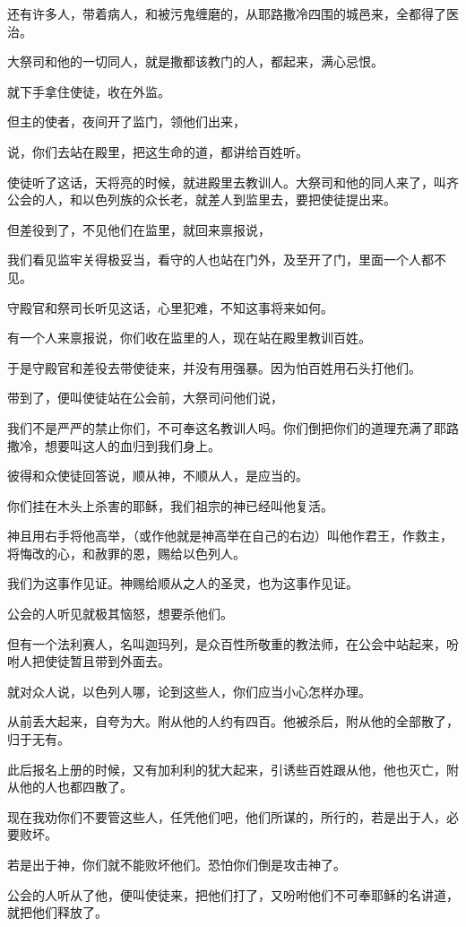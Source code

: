 \documentclass[12pt,oneside]{book}
\begin{document}
还有许多人，带着病人，和被污鬼缠磨的，从耶路撒冷四围的城邑来，全都得了医治。

大祭司和他的一切同人，就是撒都该教门的人，都起来，满心忌恨。

就下手拿住使徒，收在外监。

但主的使者，夜间开了监门，领他们出来，

说，你们去站在殿里，把这生命的道，都讲给百姓听。

使徒听了这话，天将亮的时候，就进殿里去教训人。大祭司和他的同人来了，叫齐公会的人，和以色列族的众长老，就差人到监里去，要把使徒提出来。

但差役到了，不见他们在监里，就回来禀报说，

我们看见监牢关得极妥当，看守的人也站在门外，及至开了门，里面一个人都不见。

守殿官和祭司长听见这话，心里犯难，不知这事将来如何。

有一个人来禀报说，你们收在监里的人，现在站在殿里教训百姓。

于是守殿官和差役去带使徒来，并没有用强暴。因为怕百姓用石头打他们。

带到了，便叫使徒站在公会前，大祭司问他们说，

我们不是严严的禁止你们，不可奉这名教训人吗。你们倒把你们的道理充满了耶路撒冷，想要叫这人的血归到我们身上。

彼得和众使徒回答说，顺从神，不顺从人，是应当的。

你们挂在木头上杀害的耶稣，我们祖宗的神已经叫他复活。

神且用右手将他高举，（或作他就是神高举在自己的右边）叫他作君王，作救主，将悔改的心，和赦罪的恩，赐给以色列人。

我们为这事作见证。神赐给顺从之人的圣灵，也为这事作见证。

公会的人听见就极其恼怒，想要杀他们。

但有一个法利赛人，名叫迦玛列，是众百性所敬重的教法师，在公会中站起来，吩咐人把使徒暂且带到外面去。

就对众人说，以色列人哪，论到这些人，你们应当小心怎样办理。

从前丢大起来，自夸为大。附从他的人约有四百。他被杀后，附从他的全部散了，归于无有。

此后报名上册的时候，又有加利利的犹大起来，引诱些百姓跟从他，他也灭亡，附从他的人也都四散了。

现在我劝你们不要管这些人，任凭他们吧，他们所谋的，所行的，若是出于人，必要败坏。

若是出于神，你们就不能败坏他们。恐怕你们倒是攻击神了。

公会的人听从了他，便叫使徒来，把他们打了，又吩咐他们不可奉耶稣的名讲道，就把他们释放了。
\end{document}
